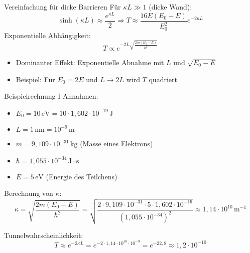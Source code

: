 \documentclass{beamer}
\begin{document}
    \begin{frame}{Vereinfachung für dicke Barrieren}
        Für \( \kappa L \gg 1 \) (dicke Wand):
        \[
            \sinh(\kappa L) \approx \frac{e^{\kappa L}}{2} \Rightarrow T \approx \frac{16E(E_0 - E)}{E_0^2}e^{-2\kappa L}
        \]
        Exponentielle Abhängigkeit:
        \[
            T \propto e^{-2L\sqrt{\frac{2m(E_0 - E)}{\hbar^2}}}
        \]
        \begin{itemize}
            \item Dominanter Effekt: Exponentielle Abnahme mit \( L \) und \( \sqrt{E_0 - E} \)
            \item Beispiel: Für \( E_0 = 2E \) und \( L \rightarrow 2L \) wird \( T \) quadriert
        \end{itemize}
    \end{frame}

    \begin{frame}{Beispielrechnung I}
        Annahmen:
        \begin{itemize}
            \item \( E_0 = 10 \, \text{eV} = 10 \cdot 1,602 \cdot 10^{-19} \, \text{J} \)
            \item \( L = 1 \, \text{nm} = 10^{-9} \, \text{m} \)
            \item \( m = 9,109 \cdot 10^{-31} \, \text{kg} \) (Masse eines Elektrons)
            \item \( \hbar = 1,055 \cdot 10^{-34} \, \text{J} \cdot \text{s} \)
            \item \( E = 5 \, \text{eV} \) (Energie des Teilchens)
        \end{itemize}

        Berechnung von \( \kappa \):
        \[
            \kappa = \sqrt{\frac{2m(E_0 - E)}{\hbar^2}} = \sqrt{\frac{2 \cdot 9,109 \cdot 10^{-31} \cdot 5 \cdot 1,602 \cdot 10^{-19}}{(1,055 \cdot 10^{-34})^2}} \approx 1,14 \cdot 10^{10} \, \text{m}^{-1}
        \]

        Tunnelwahrscheinlichkeit:
        \[
            T \approx e^{-2\kappa L} = e^{-2 \cdot 1,14 \cdot 10^{10} \cdot 10^{-9}} = e^{-22,8} \approx 1,2 \cdot 10^{-10}
        \]
    \end{frame}
\end{document}
